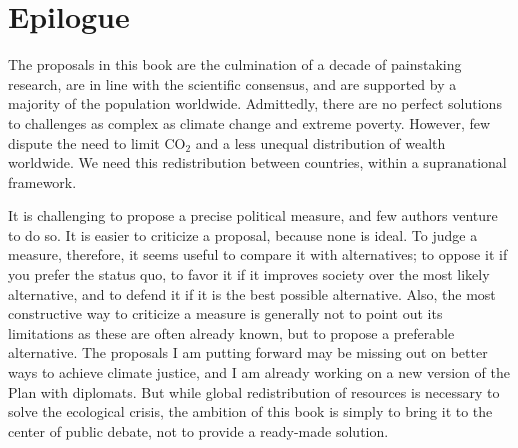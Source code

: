 \documentclass[a5paper,english,openany]{memoir}
\begin{document}
\chapter{Epilogue} %

The proposals in this book are the culmination %
of a decade of painstaking research, are in line with the scientific consensus, and are supported by a majority of the population worldwide. 
Admittedly, there are no perfect solutions to challenges as complex as climate change and extreme poverty. 
However, few dispute the need to limit CO$_\text{2}$ and %
a less unequal distribution of wealth worldwide. We need %
this redistribution between countries, within a supranational framework. 

It is challenging %
to propose a precise political measure, and few authors %
venture to do so. It is easier to criticize %
a proposal, because none is ideal. To judge a measure, therefore, it seems useful to compare it with alternatives; to oppose it if you prefer the status quo, to favor %
it if it improves society over the most likely alternative, and to defend it if it is the best possible alternative. Also, the most constructive way to criticize %
a measure is generally not to point out its limitations  as these are often already known, %
but to propose a preferable alternative. 
The proposals I am putting forward %
may be missing out on better ways to achieve %
climate justice, and I am already working on a new version of the Plan with diplomats. 
But while global redistribution of resources is necessary to solve the ecological crisis, the ambition of this book is simply to bring it to the center %
of public debate, not to provide a ready-made solution. 
\end{document}
